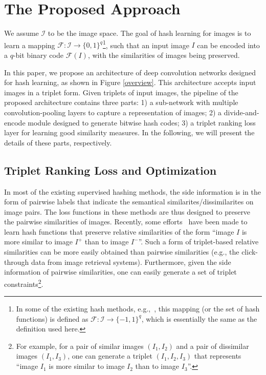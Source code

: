 \documentclass[10pt,twocolumn,letterpaper]{article}
\begin{document}
\section{The Proposed Approach}
We assume $\mathcal{I}$ to be the image space. The goal of hash
learning for images is to learn a mapping
$\mathcal{F}:\mathcal{I}\rightarrow \{0,1\}^{q}$\footnote{In some of
the existing hash methods, e.g.,~\cite{CNNH,KSH}, this mapping (or
the set of hash functions) is defined as
$\mathcal{F}:\mathcal{I}\rightarrow \{-1,1\}^{q}$, which is
essentially the same as the definition used here.}, such that an
input image $I$ can be encoded into a $q$-bit binary code
$\mathcal{F}(I)$, with the similarities of images being preserved.

In this paper, we propose an architecture of deep convolution
networks designed for hash learning, as shown in Figure
\ref{overview}. This architecture accepts input images in a triplet
form. Given triplets of input images, the pipeline of the proposed
architecture contains three parts: 1) a sub-network with multiple
convolution-pooling layers to capture a representation of images; 2)
a divide-and-encode module designed to generate bitwise hash
codes; 3) a triplet ranking loss layer for learning good similarity
measures. In the following, we will present the details of these
parts, respectively.

\subsection{Triplet Ranking Loss and Optimization}
In most of the existing supervised hashing methods, the side
information is in the form of pairwise labels that indicate the
semantical similarites/dissimilarites on image pairs. The loss
functions in these methods are thus designed to preserve the
pairwise similarities of images. Recently, some
efforts~\cite{triplet,CGHash} have been made to learn hash functions
that preserve relative similarities of the form ``image $I$ is more
similar to image $I^+$ than to image $I^-$''. Such a form of
triplet-based relative similarities can be more easily obtained than
pairwise similarities (e.g., the click-through data from image
retrieval systems). Furthermore, given the side information of
pairwise similarities, one can easily generate a set of triplet
constraints\footnote{For example, for a pair of similar images
$(I_1,I_2)$ and a pair of dissimilar images $(I_1,I_3)$, one can
generate a triplet $(I_1,I_2,I_3)$ that represents ``image $I_1$ is
more similar to image $I_2$ than to image $I_3$''.}.
\end{document}
